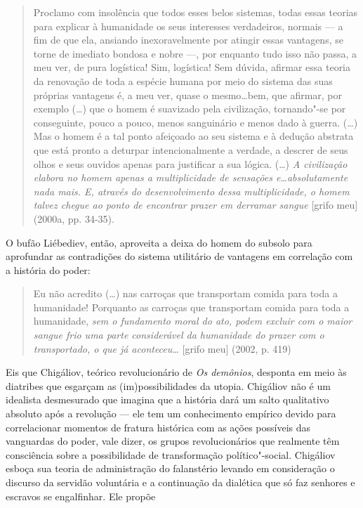 \begin{quote}
Proclamo com insolência que todos esses belos sistemas, todas essas
teorias para explicar à humanidade os seus interesses verdadeiros,
normais --- a fim de que ela, ansiando inexoravelmente por atingir essas
vantagens, se torne de imediato bondosa e nobre ---, por enquanto tudo
isso não passa, a meu ver, de pura logística! Sim, logística! Sem
dúvida, afirmar essa teoria da renovação de toda a espécie humana por
meio do sistema das suas próprias vantagens é, a meu ver, quase o
mesmo\ldots bem, que afirmar, por exemplo (\ldots) que o homem é suavizado
pela civilização, tornando"-se por conseguinte, pouco a pouco, menos
sanguinário e menos dado à guerra. (\ldots) Mas o homem é a tal ponto
afeiçoado ao seu sistema e à dedução abstrata que está pronto a deturpar
intencionalmente a verdade, a descrer de seus olhos e seus ouvidos
apenas para justificar a sua lógica. (\ldots) \emph{A civilização elabora
no homem apenas a multiplicidade de sensações e\ldots absolutamente nada
mais. E, através do desenvolvimento dessa multiplicidade, o homem talvez
chegue ao ponto de encontrar prazer em derramar sangue} {[}grifo meu{]}
(2000a, pp. 34-35).
\end{quote}

O bufão Liébediev, então, aproveita a deixa do homem do subsolo para
aprofundar as contradições do sistema utilitário de vantagens em
correlação com a história do poder:

\begin{quote}
Eu não acredito (\ldots) nas carroças que transportam comida para toda a
humanidade! Porquanto as carroças que transportam comida para toda a
humanidade, \emph{sem o fundamento moral do ato, podem excluir com o
maior sangue frio uma parte considerável da humanidade do prazer com o
transportado, o que já aconteceu\ldots} {[}grifo meu{]} (2002, p. 419)
\end{quote}

Eis que Chigáliov, teórico revolucionário de \emph{Os demônios},
desponta em meio às diatribes que esgarçam as (im)possibilidades da
utopia. Chigáliov não é um idealista desmesurado que imagina que a
história dará um salto qualitativo absoluto após a revolução --- ele tem
um conhecimento empírico devido para correlacionar momentos de fratura
histórica com as ações possíveis das vanguardas do poder, vale dizer, os
grupos revolucionários que realmente têm consciência sobre a
possibilidade de transformação político"-social. Chigáliov esboça sua
teoria de administração do falanstério levando em consideração o
discurso da servidão voluntária e a continuação da dialética que só faz
senhores e escravos se engalfinhar. Ele propõe

